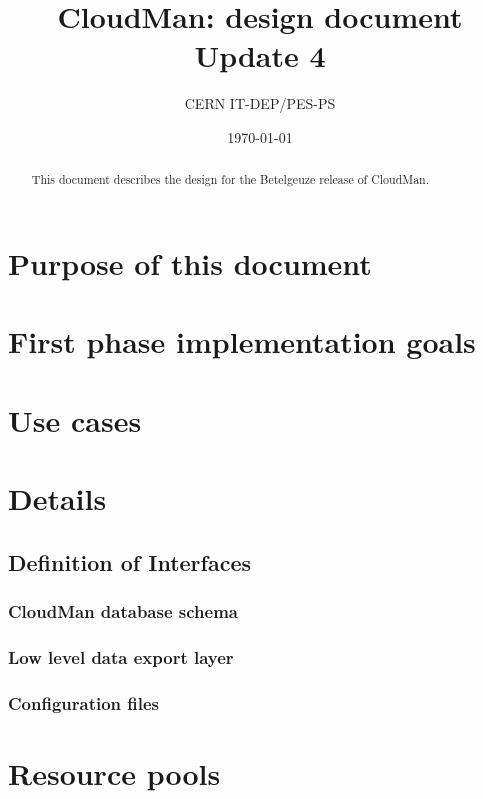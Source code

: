 \documentclass[12pt]{article}
\begin{document}
\thispagestyle{empty}
\title{CloudMan: design document Update 4}
\author{CERN IT-DEP/PES-PS}
\date{\today}
\maketitle 
\begin{abstract}
This document describes the design for the Betelgeuze release of CloudMan.
\end{abstract}
%
%
\tableofcontents
\listoffigures 

%
%
\section{Purpose of this document} 


%
%
\section{First phase implementation goals}

%
%
\section{Use cases}


%
%
\section{Details}


\subsection{Definition of Interfaces}
\subsubsection{CloudMan database schema}


\subsubsection{Low level data export layer}


\subsubsection{Configuration files}


\section{Resource pools}

\end{document}
